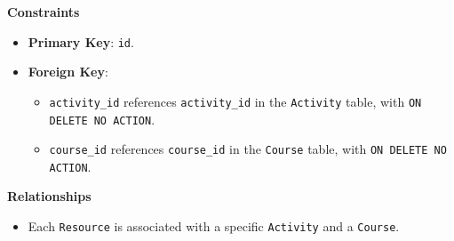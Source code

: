 \documentclass[12pt]{article}
\begin{document}
\noindent
\textbf{Constraints}
\begin{itemize}
    \item \textbf{Primary Key}: \texttt{id}.
    \item \textbf{Foreign Key}: 
    \begin{itemize}
        \item \texttt{activity\_id} references \texttt{activity\_id} in the \texttt{Activity} table, with \texttt{ON DELETE NO ACTION}.
        \item \texttt{course\_id} references \texttt{course\_id} in the \texttt{Course} table, with \texttt{ON DELETE NO ACTION}.
    \end{itemize}
\end{itemize}

\noindent
\textbf{Relationships}
\begin{itemize}
    \item Each \texttt{Resource} is associated with a specific \texttt{Activity} and a \texttt{Course}.
\end{itemize}

\pagebreak
\end{document}
